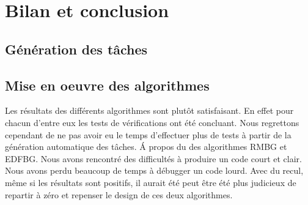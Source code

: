 \chapter{Bilan et conclusion}
\section{Génération des tâches}



\section{Mise en oeuvre des algorithmes}

Les résultats des différents algorithmes sont plutôt satisfaisant. En effet pour chacun d'entre eux les tests de vérifications ont été concluant. Nous regrettons cependant de ne pas avoir eu le temps d'effectuer plus de tests à partir de la génération automatique des tâches.
\'A propos du des algorithmes RMBG et EDFBG. Nous avons rencontré des difficultés à produire un code court et clair. Nous avons perdu beaucoup de temps à débugger un code lourd. Avec du recul, même si les résultats sont positifs, il aurait été peut être été plus judicieux de repartir à zéro et repenser le design de ces deux algorithmes. 

